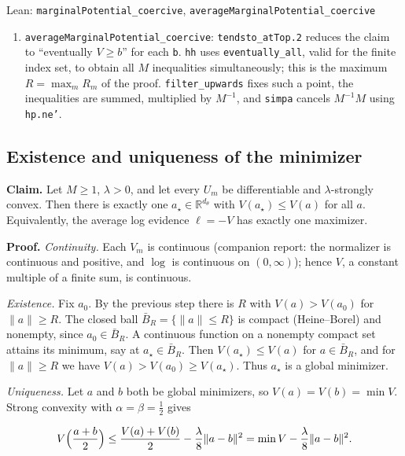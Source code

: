 \documentclass[11pt,a4paper]{report}
\begin{document}
\begin{leanbox}{Lean: \texttt{marginalPotential\_\allowbreak{}coercive}, \texttt{averageMarginalPotential\_\allowbreak{}coercive}}
\begin{enumerate}
\item \texttt{average\allowbreak{}Marginal\allowbreak{}Potential\_\allowbreak{}coercive}: \texttt{tendsto\_\allowbreak{}at\allowbreak{}Top.\allowbreak{}2} reduces the claim to “eventually \(V\ge b\)” for each \texttt{b}. \texttt{hh} uses \texttt{eventually\_\allowbreak{}all}, valid for the finite index set, to obtain all \(M\) inequalities simultaneously; this is the maximum \(R=\max_mR_m\) of the proof. \texttt{filter\_\allowbreak{}upwards} fixes such a point, the inequalities are summed, multiplied by \(M^{-1}\), and \texttt{simpa} cancels \(M^{-1}M\) using \texttt{hp.\allowbreak{}ne'}.

\end{enumerate}
\end{leanbox}
\subsection{\texorpdfstring{Existence and uniqueness of the minimizer}{Existence and uniqueness of the minimizer}}


\textbf{Claim.} Let \(M\ge1\), \(\lambda>0\), and let every \(U_m\) be differentiable and \(\lambda\)-strongly convex. Then there is exactly one \(a_\star\in\mathbb R^{d_\theta}\) with \(V(a_\star)\le V(a)\) for all \(a\). Equivalently, the average log evidence \(\ell=-V\) has exactly one maximizer.




\textbf{Proof.} \emph{Continuity.} Each \(V_m\) is continuous (companion report: the normalizer is continuous and positive, and \(\log\) is continuous on \((0,\infty)\)); hence \(V\), a constant multiple of a finite sum, is continuous.




\emph{Existence.} Fix \(a_0\). By the previous step there is \(R\) with \(V(a)>V(a_0)\) for \(\|a\|\ge R\). The closed ball \(\bar B_R=\{\|a\|\le R\}\) is compact (Heine–Borel) and nonempty, since \(a_0\in\bar B_R\). A continuous function on a nonempty compact set attains its minimum, say at \(a_\star\in\bar B_R\). Then \(V(a_\star)\le V(a)\) for \(a\in\bar B_R\), and for \(\|a\|\ge R\) we have \(V(a)>V(a_0)\ge V(a_\star)\). Thus \(a_\star\) is a global minimizer.




\emph{Uniqueness.} Let \(a\) and \(b\) both be global minimizers, so \(V(a)=V(b)=\min V\). Strong convexity with \(\alpha=\beta=\frac12\) gives


\[V\Bigl(\frac{a+b}2\Bigr)\le\frac{V(a)+V(b)}2-\frac\lambda8\|a-b\|^2=\min V-\frac\lambda8\|a-b\|^2.\]
\end{document}

